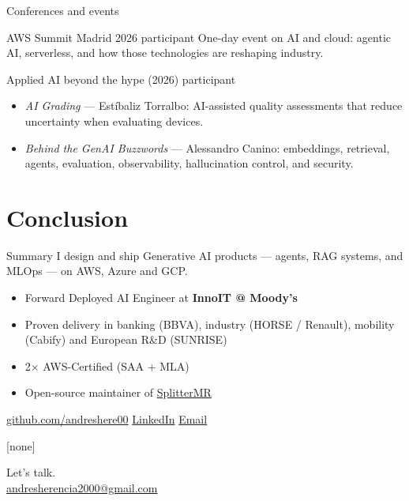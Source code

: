 \documentclass[10pt]{beamer}
\begin{document}
\begin{frame}{Conferences and events}
  \begin{block}{AWS Summit Madrid 2026 \textperiodcentered{} participant}
    One-day event on AI and cloud: agentic AI, serverless, and how those
    technologies are reshaping industry.
  \end{block}

  \begin{exampleblock}{Applied AI beyond the hype (2026) \textperiodcentered{} participant}
    \begin{itemize}
      \item \emph{AI Grading} --- Est\'ibaliz Torralbo: AI-assisted quality
            assessments that reduce uncertainty when evaluating devices.
      \item \emph{Behind the GenAI Buzzwords} --- Alessandro Canino:
            embeddings, retrieval, agents, evaluation, observability,
            hallucination control, and security.
    \end{itemize}
  \end{exampleblock}
\end{frame}

\section{Conclusion}

\begin{frame}{Summary}
  I design and ship \alert{Generative AI products} --- agents, RAG systems,
  and MLOps --- on AWS, Azure and GCP.

  \vspace{0.5em}
  \begin{itemize}
    \item Forward Deployed AI Engineer at \textbf{InnoIT @ Moody's}
    \item Proven delivery in banking (BBVA), industry (HORSE / Renault),
          mobility (Cabify) and European R\&D (SUNRISE)
    \item 2$\times$ AWS-Certified (SAA + MLA)
    \item Open-source maintainer of
          \href{https://github.com/andreshere00/Splitter_MR}{SplitterMR}
  \end{itemize}

  \vspace{0.4em}
  \begin{center}
    \href{https://github.com/andreshere00}{github.com/andreshere00}
    \quad\textbullet\quad
    \href{https://www.linkedin.com/in/andres-herencia/}{LinkedIn}
    \quad\textbullet\quad
    \href{mailto:andresherencia2000@gmail.com}{Email}
  \end{center}
\end{frame}

{
[none]
\begin{frame}[standout]
  Let's talk.\\[0.6em]
  {\normalsize
    \href{mailto:andresherencia2000@gmail.com}{andresherencia2000@gmail.com}}
\end{frame}
}
\end{document}
